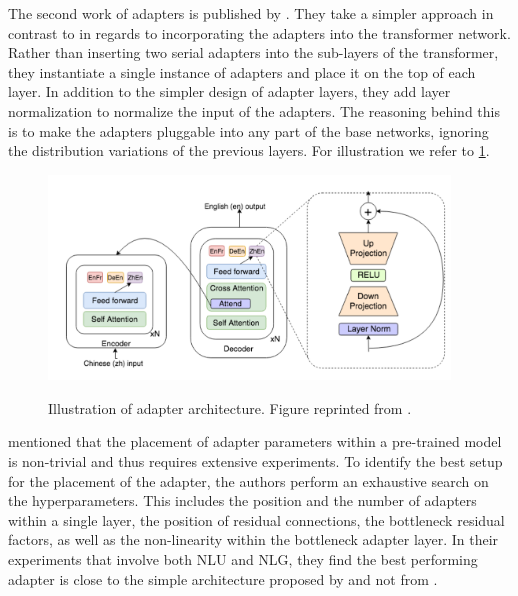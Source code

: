 The second work of adapters is published by . They take a simpler approach in contrast to  in regards to incorporating the adapters into the transformer network. Rather than inserting two serial adapters into the sub-layers of the transformer, they instantiate a single instance of adapters and place it on the top of each layer. In addition to the simpler design of adapter layers, they add layer normalization to normalize the input of the adapters. The reasoning behind this is to make the adapters pluggable into any part of the base networks, ignoring the distribution variations of the previous layers. For illustration we refer to \cref{img:ada_bapna}.

\begin{figure}[h]
    {\includegraphics[width=0.95\textwidth]{img/adapter_bapna.png}}
    \centering
    \caption{Illustration of adapter architecture. Figure reprinted from .}
    \label{img:ada_bapna}
\end{figure}

 mentioned that the placement of adapter parameters within a pre-trained model is non-trivial and thus requires extensive experiments. To identify the best setup for the placement of the adapter, the authors perform an exhaustive search on the hyperparameters. This includes the position and the number of adapters within a single layer, the position of residual connections, the bottleneck residual factors, as well as the non-linearity within the bottleneck adapter layer. In their experiments that involve both NLU and NLG, they find the best performing adapter is close to the simple architecture proposed by  and not from .

